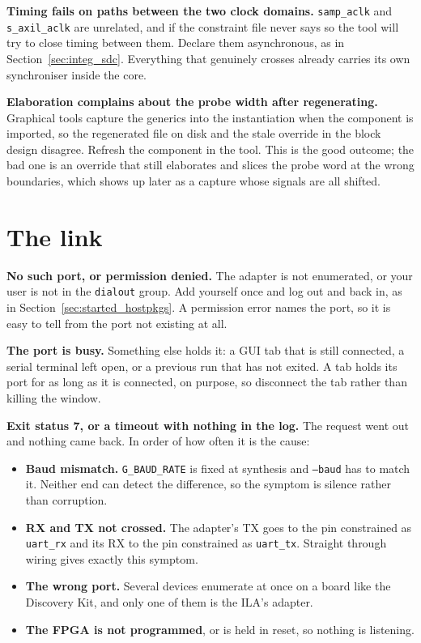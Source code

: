 \documentclass[../manual.tex]{subfiles}
\begin{document}
\textbf{Timing fails on paths between the two clock domains.} \texttt{samp\_aclk} and \texttt{s\_axil\_aclk} are unrelated, and if the constraint file never says so the tool will try to close timing between them. Declare them asynchronous, as in Section~\ref{sec:integ_sdc}. Everything that genuinely crosses already carries its own synchroniser inside the core.

\textbf{Elaboration complains about the probe width after regenerating.} Graphical tools capture the generics into the instantiation when the component is imported, so the regenerated file on disk and the stale override in the block design disagree. Refresh the component in the tool. This is the good outcome; the bad one is an override that still elaborates and slices the probe word at the wrong boundaries, which shows up later as a capture whose signals are all shifted.

\section{The link}
\label{sec:tr_link}

\textbf{No such port, or permission denied.} The adapter is not enumerated, or your user is not in the \texttt{dialout} group. Add yourself once and log out and back in, as in Section~\ref{sec:started_hostpkgs}. A permission error names the port, so it is easy to tell from the port not existing at all.

\textbf{The port is busy.} Something else holds it: a GUI tab that is still connected, a serial terminal left open, or a previous run that has not exited. A tab holds its port for as long as it is connected, on purpose, so disconnect the tab rather than killing the window.

\textbf{Exit status 7, or a timeout with nothing in the log.} The request went out and nothing came back. In order of how often it is the cause:

\begin{itemize}
    \item \textbf{Baud mismatch.} \texttt{G\_BAUD\_RATE} is fixed at synthesis and \texttt{--baud} has to match it. Neither end can detect the difference, so the symptom is silence rather than corruption.
    \item \textbf{RX and TX not crossed.} The adapter's TX goes to the pin constrained as \texttt{uart\_rx} and its RX to the pin constrained as \texttt{uart\_tx}. Straight through wiring gives exactly this symptom.
    \item \textbf{The wrong port.} Several devices enumerate at once on a board like the Discovery Kit, and only one of them is the ILA's adapter.
    \item \textbf{The FPGA is not programmed}, or is held in reset, so nothing is listening.
\end{itemize}
\end{document}
